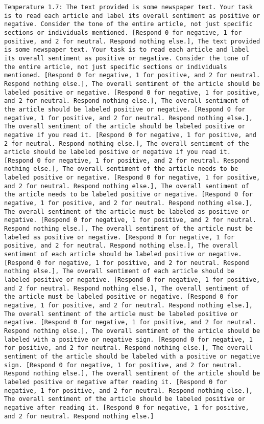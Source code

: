 \begin{lstlisting}[label=lst:poor_performing_prompts]
	Temperature 1.7: The text provided is some newspaper text. Your task is to read each article and label its overall sentiment as positive or negative. Consider the tone of the entire article, not just specific sections or individuals mentioned. [Respond 0 for negative, 1 for positive, and 2 for neutral. Respond nothing else.], The text provided is some newspaper text. Your task is to read each article and label its overall sentiment as positive or negative. Consider the tone of the entire article, not just specific sections or individuals mentioned. [Respond 0 for negative, 1 for positive, and 2 for neutral. Respond nothing else.], The overall sentiment of the article should be labeled positive or negative. [Respond 0 for negative, 1 for positive, and 2 for neutral. Respond nothing else.], The overall sentiment of the article should be labeled positive or negative. [Respond 0 for negative, 1 for positive, and 2 for neutral. Respond nothing else.], The overall sentiment of the article should be labeled positive or negative if you read it. [Respond 0 for negative, 1 for positive, and 2 for neutral. Respond nothing else.], The overall sentiment of the article should be labeled positive or negative if you read it. [Respond 0 for negative, 1 for positive, and 2 for neutral. Respond nothing else.], The overall sentiment of the article needs to be labeled positive or negative. [Respond 0 for negative, 1 for positive, and 2 for neutral. Respond nothing else.], The overall sentiment of the article needs to be labeled positive or negative. [Respond 0 for negative, 1 for positive, and 2 for neutral. Respond nothing else.], The overall sentiment of the article must be labeled as positive or negative. [Respond 0 for negative, 1 for positive, and 2 for neutral. Respond nothing else.], The overall sentiment of the article must be labeled as positive or negative. [Respond 0 for negative, 1 for positive, and 2 for neutral. Respond nothing else.], The overall sentiment of each article should be labeled positive or negative. [Respond 0 for negative, 1 for positive, and 2 for neutral. Respond nothing else.], The overall sentiment of each article should be labeled positive or negative. [Respond 0 for negative, 1 for positive, and 2 for neutral. Respond nothing else.], The overall sentiment of the article must be labeled positive or negative. [Respond 0 for negative, 1 for positive, and 2 for neutral. Respond nothing else.], The overall sentiment of the article must be labeled positive or negative. [Respond 0 for negative, 1 for positive, and 2 for neutral. Respond nothing else.], The overall sentiment of the article should be labeled with a positive or negative sign. [Respond 0 for negative, 1 for positive, and 2 for neutral. Respond nothing else.], The overall sentiment of the article should be labeled with a positive or negative sign. [Respond 0 for negative, 1 for positive, and 2 for neutral. Respond nothing else.], The overall sentiment of the article should be labeled positive or negative after reading it. [Respond 0 for negative, 1 for positive, and 2 for neutral. Respond nothing else.], The overall sentiment of the article should be labeled positive or negative after reading it. [Respond 0 for negative, 1 for positive, and 2 for neutral. Respond nothing else.]

\end{lstlisting}
